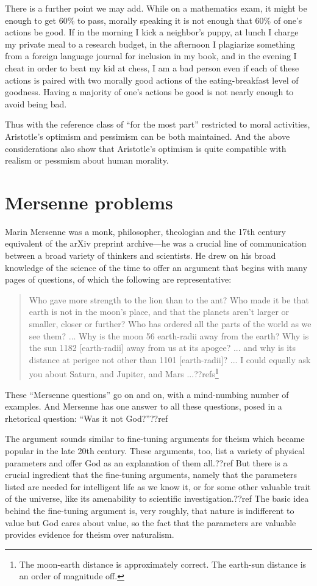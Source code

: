 There is a further point we may add. While on a mathematics exam, it might be enough to get 60\% to pass,
morally speaking it is not enough that 60\% of one's actions be good. If in the morning I kick a neighbor's puppy,
at lunch I charge my private meal to a research budget, in the afternoon I plagiarize something from a foreign
language journal for inclusion in my book, and in the evening I cheat in order to beat my kid at chess, I am a bad
person even if each of these actions is paired with two morally good actions of the eating-breakfast level of 
goodness. Having a majority of one's actions be good is not nearly enough to avoid being bad. 

Thus with the reference class of ``for the most part'' restricted to moral activities, Aristotle's optimism and pessimism
can be both maintained. And the above considerations also show that Aristotle's optimism is quite compatible with 
realism or pessmism about human morality.

\section{Mersenne problems}
Marin Mersenne was a monk, philosopher, theologian and the 17th century equivalent of the arXiv preprint archive---he was 
a crucial line of communication between a broad variety of thinkers and scientists. He drew on his broad knowledge of
the science of the time to offer an argument that begins with many pages of questions, of which the following are
representative:
\begin{quote}
Who gave more strength to the lion than to the ant?
Who made it be that earth is not in the moon's place, and that the planets aren't larger or smaller, closer or further?
Who has ordered all the parts of the world as we see them?
...
Why is the moon 56 earth-radii away from the earth? Why is the sun 1182 [earth-radii] away from us at its apogee? ... and why is its distance at perigee not other than 1101 [earth-radii]? ...
I could equally ask you about Saturn, and Jupiter, and Mars ...??refs\footnote{The moon-earth distance is approximately correct.
The earth-sun distance is an order of magnitude off.}
\end{quote}
These ``Mersenne questions'' go on and on, with a mind-numbing number of examples. And Mersenne has one answer to all
these questions, posed in a rhetorical question: ``Was it not God?''??ref

The argument sounds similar to fine-tuning arguments for theism which became popular in the late 20th century. These
arguments, too, list a variety of physical parameters and offer God as an explanation of them all.??ref But there is
a crucial ingredient that the fine-tuning arguments, namely that the parameters listed are needed for intelligent life
as we know it, or for some other valuable trait of the universe, like its amenability to scientific investigation.??ref
The basic idea behind the fine-tuning argument is, very roughly, that nature is indifferent to value but God cares 
about value, so the fact that the parameters are valuable provides evidence for theism over naturalism.

